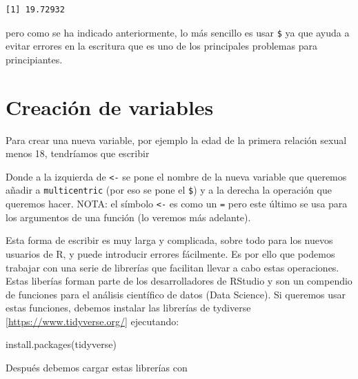 \documentclass[
]{book}
\newenvironment{Shaded}{\begin{snugshade}}{\end{snugshade}}
\newcommand{\DecValTok}[1]{\textcolor[rgb]{0.00,0.00,0.81}{#1}}
\newcommand{\FunctionTok}[1]{\textcolor[rgb]{0.00,0.00,0.00}{#1}}
\newcommand{\NormalTok}[1]{#1}
\newcommand{\OtherTok}[1]{\textcolor[rgb]{0.56,0.35,0.01}{#1}}
\newcommand{\SpecialCharTok}[1]{\textcolor[rgb]{0.00,0.00,0.00}{#1}}
\begin{document}
\begin{verbatim}
[1] 19.72932
\end{verbatim}

pero como se ha indicado anteriormente, lo más sencillo es usar \texttt{\$} ya que ayuda a evitar errores en la escritura que es uno de los principales problemas para principiantes.

\hypertarget{creaciuxf3n-de-variables}{%
\section{Creación de variables}\label{creaciuxf3n-de-variables}}

Para crear una nueva variable, por ejemplo la edad de la primera relación sexual menos 18, tendríamos que escribir

\begin{Shaded}
\end{Shaded}

Donde a la izquierda de \texttt{\textless{}-} se pone el nombre de la nueva variable que queremos añadir a \texttt{multicentric} (por eso se pone el \texttt{\$}) y a la derecha la operación que queremos hacer. NOTA: el símbolo \texttt{\textless{}-} es como un \texttt{=} pero este último se usa para los argumentos de una función (lo veremos más adelante).

Esta forma de escribir es muy larga y complicada, sobre todo para los nuevos usuarios de R, y puede introducir errores fácilmente. Es por ello que podemos trabajar con una serie de librerías que facilitan llevar a cabo estas operaciones. Estas liberías forman parte de los desarrolladores de RStudio y son un compendio de funciones para el análisis científico de datos (Data Science). Si queremos usar estas funciones, debemos instalar las librerías de tydiverse {[}\url{https://www.tidyverse.org/}{]} ejecutando:

\begin{Shaded}
\begin{Highlighting}[]
\FunctionTok{install.packages}\NormalTok{(tidyverse)}
\end{Highlighting}
\end{Shaded}

Después debemos cargar estas librerías con
\end{document}
